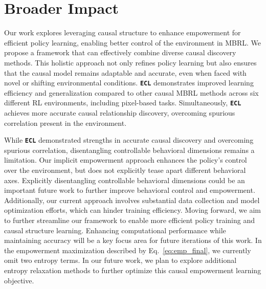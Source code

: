 
\maketitle


\clearpage
\appendix
\tableofcontents
\clearpage

\section{Broader Impact}
\label{Broader Impact}
Our work explores leveraging causal structure to enhance empowerment for efficient policy learning, enabling better control of the environment in MBRL. We propose a framework that can effectively combine diverse causal discovery methods. This holistic approach not only refines policy learning but also ensures that the causal model remains adaptable and accurate, even when faced with novel or shifting environmental conditions. \texttt{\textbf{ECL}} demonstrates improved learning efficiency and generalization compared to other causal MBRL methods across six different RL environments, including pixel-based tasks. 
Simultaneously, \texttt{\textbf{ECL}} achieves more accurate causal relationship discovery, overcoming spurious correlation present in the environment. 

While \texttt{\textbf{ECL}} demonstrated strengths in accurate causal discovery and overcoming spurious correlation, disentangling controllable behavioral dimensions remains a limitation. Our implicit empowerment approach enhances the policy's control over the environment, but does not explicitly tease apart different behavioral axes. Explicitly disentangling controllable behavioral dimensions could be an important future work to further improve behavioral control and empowerment. 
Additionally, our current approach involves substantial data collection and model optimization efforts, which can hinder training efficiency. Moving forward, we aim to further streamline our framework to enable more efficient policy training and causal structure learning. Enhancing computational performance while maintaining accuracy will be a key focus area for future iterations of this work. In the empowerment maximization described by Eq.~\ref{eq:emp_final}, we currently omit two entropy terms. In our future work, we plan to explore additional entropy relaxation methods to further optimize this causal empowerment learning objective. 

